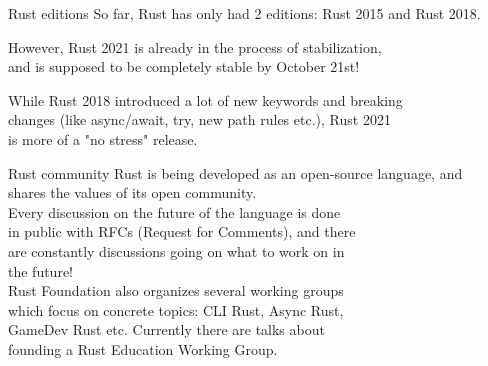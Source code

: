 \documentclass[usenames,dvipsnames,10pt,aspectratio=169]{beamer}
\begin{document}
\begin{frame}{Rust editions}
	\large
	So far, Rust has only had 2 editions: Rust 2015 and Rust 2018.\\

	\vspace{0.3cm}
	
	However, Rust 2021 is already in the process of stabilization,\\
	and is supposed to be completely stable by October 21st!\\

	\vspace{0.3cm}
	
	While Rust 2018 introduced a lot of new keywords and breaking\\
	changes (like \textcolor{ucuyellow}{async}/\textcolor{ucuyellow}{await}, \textcolor{ucuyellow}{try}, 
	new path rules etc.), Rust 2021\\
	is more of a "no stress" release.
\end{frame}

\begin{frame}{Rust community}
	\large
	Rust is being developed as an open-source language, and\\
	shares the values of its open community.\\

	\vspace{0.3cm}
	Every discussion on the future of the language is done\\
	in public with RFCs (Request for Comments), and there\\
	are constantly discussions going on what to work on in\\
	the future!\\

	\vspace{0.3cm}
	Rust Foundation also organizes several working groups\\
	which focus on concrete topics: CLI Rust, Async Rust,\\
	GameDev Rust etc. Currently there are talks about\\
	founding a Rust Education Working Group.
\end{frame}

\end{document}
